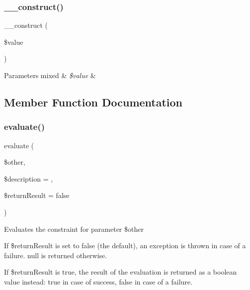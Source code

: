 \subsubsection{\texorpdfstring{\+\_\+\+\_\+construct()}{\_\_construct()}}
{\footnotesize\ttfamily \+\_\+\+\_\+construct (\begin{DoxyParamCaption}\item[{}]{\$value }\end{DoxyParamCaption})}


\begin{DoxyParams}[1]{Parameters}
mixed & {\em \$value} & \\
\hline
\end{DoxyParams}


\subsection{Member Function Documentation}
\mbox{\label{class_p_h_p_unit___framework___constraint___is_identical_a4c184790087f7d42c3daf0d0180fe5fb}} 
\subsubsection{\texorpdfstring{evaluate()}{evaluate()}}
{\footnotesize\ttfamily evaluate (\begin{DoxyParamCaption}\item[{}]{\$other,  }\item[{}]{\$description = {\ttfamily \textquotesingle{}\textquotesingle{}},  }\item[{}]{\$return\+Result = {\ttfamily false} }\end{DoxyParamCaption})}

Evaluates the constraint for parameter \$other

If \$return\+Result is set to false (the default), an exception is thrown in case of a failure. null is returned otherwise.

If \$return\+Result is true, the result of the evaluation is returned as a boolean value instead\+: true in case of success, false in case of a failure.


